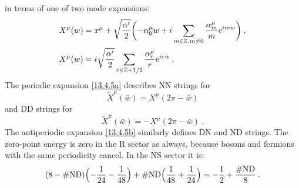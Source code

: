 in terms of one of two mode expansions:
\begin{subequations} \label{13.4.5}
	\begin{align}
		X^\mu(w) &= x^\mu + \sqrt{\frac{\alpha'}{2}}\biggl(-\alpha_0^\mu w + i\sum_{m\in\mathbb{Z}, m\neq 0}\frac{\alpha_m^\mu}{m}\mathrm{e}^{i m w}\biggr) \:, \label{13.4.5a} \\
		X^\mu(w) &= i\sqrt{\frac{\alpha'}{2}}\sum_{r\in\mathbb{Z}+1/2}\frac{\alpha_r^\mu}{r}\mathrm{e}^{i r w} \:. \label{13.4.5b}
	\end{align}
\end{subequations}
The periodic expansion \eqref{13.4.5a} describes NN strings for
\begin{equation}
	\tilde{X}^\mu(\bar{w}) = X^\mu(2\pi - \bar{w}) \label{13.4.6}
\end{equation}
and DD strings for
\begin{equation}
	\tilde{X}^\mu(\bar{w}) = -X^\mu(2\pi - \bar{w}) \:. \label{13.4.7}
\end{equation}
The antiperiodic expansion \eqref{13.4.5b} similarly defines DN and ND strings. The zero-point energy is zero in the R sector as always, because bosons and fermions with the same periodicity cancel. In the NS sector it is:
\begin{equation}
	(8 - \#\mathrm{ND})\Bigl(-\frac{1}{24} - \frac{1}{48}\Bigr) + \#\mathrm{ND}\Bigl(\frac{1}{48} + \frac{1}{24}\Bigr) = -\frac{1}{2} + \frac{\#\mathrm{ND}}{8} \:. \label{13.4.8}
\end{equation}
